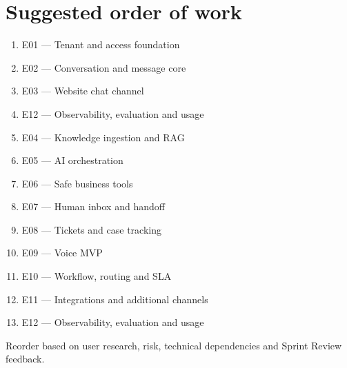 \section{Suggested order of work}
\begin{enumerate}
\item E01 --- Tenant and access foundation
\item E02 --- Conversation and message core
\item E03 --- Website chat channel
\item E12 --- Observability, evaluation and usage
\item E04 --- Knowledge ingestion and RAG
\item E05 --- AI orchestration
\item E06 --- Safe business tools
\item E07 --- Human inbox and handoff
\item E08 --- Tickets and case tracking
\item E09 --- Voice MVP
\item E10 --- Workflow, routing and SLA
\item E11 --- Integrations and additional channels
\item E12 --- Observability, evaluation and usage
\end{enumerate}
Reorder based on user research, risk, technical dependencies and Sprint Review feedback.





